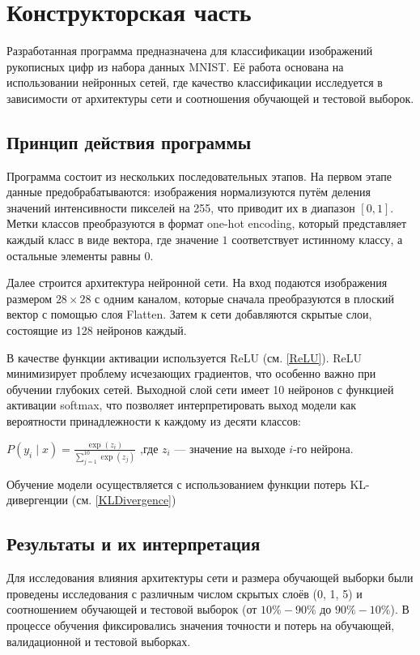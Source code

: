 \chapter{Конструкторская часть}

Разработанная программа предназначена для классификации изображений рукописных цифр из набора данных MNIST. 
Её работа основана на использовании нейронных сетей, где качество классификации исследуется в зависимости от архитектуры сети и соотношения обучающей и тестовой выборок.

\section{Принцип действия программы}

Программа состоит из нескольких последовательных этапов. 
На первом этапе данные предобрабатываются: 
изображения нормализуются путём деления значений интенсивности пикселей на 255, что приводит их в диапазон $[0, 1]$. 
Метки классов преобразуются в формат one-hot encoding, который представляет каждый класс в виде вектора, 
где значение $1$ соответствует истинному классу, а остальные элементы равны $0$.

Далее строится архитектура нейронной сети. 
На вход подаются изображения размером $28 \times 28$ с одним каналом, которые сначала преобразуются в плоский вектор с помощью слоя Flatten. 
Затем к сети добавляются скрытые слои, состоящие из 128 нейронов каждый. 

В качестве функции активации используется ReLU (см. \ref{ReLU}).
ReLU минимизирует проблему исчезающих градиентов, что особенно важно при обучении глубоких сетей. 
Выходной слой сети имеет 10 нейронов с функцией активации softmax, 
что позволяет интерпретировать выход модели как вероятности принадлежности к каждому из десяти классов:

\begin{math}
    P(y_i \mid x) = \frac{\exp(z_i)}{\sum_{j=1}^{10} \exp(z_j)}
\end{math} \cite{lib:softmax}
,где $z_i$ — значение на выходе $i$-го нейрона.

Обучение модели осуществляется с использованием функции потерь KL-дивергенции (см. \ref{KLDivergence})

\section{Результаты и их интерпретация}

Для исследования влияния архитектуры сети и размера обучающей выборки были проведены исследования с различным числом скрытых слоёв (0, 1, 5) 
и соотношением обучающей и тестовой выборок (от $10\%-90\%$ до $90\%-10\%$). 
В процессе обучения фиксировались значения точности и потерь на обучающей, валидационной и тестовой выборках.

